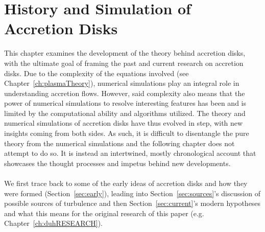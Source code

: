 \chapter{History and Simulation of Accretion Disks}
This chapter examines the development of the theory behind accretion disks, with the ultimate goal of framing the past and current research on accretion disks. Due to the complexity of the equations involved (see Chapter~\ref{ch:plasmaTheory}), numerical simulations play an integral role in understanding accretion flows. However, said complexity also means that the power of numerical simulations to resolve interesting features has been and is limited by the computational ability and algorithms utilized. The theory and numerical simulations of accretion disks have thus evolved in step, with new insights coming from both sides. As such, it is difficult to disentangle the pure theory from the numerical simulations and the following chapter does not attempt to do so. It is instead an intertwined, mostly chronological account that showcases the thought processes and impetus behind new developments.\\
\\
We first trace back to some of the early ideas of accretion disks and how they were formed (Section~\ref{sec:early}), leading into Section~\ref{sec:sources}'s discussion of possible sources of turbulence and then Section~\ref{sec:current}'s modern hypotheses and what this means for the original research of this paper (e.g. Chapter~\ref{ch:duhRESEARCH}). 


